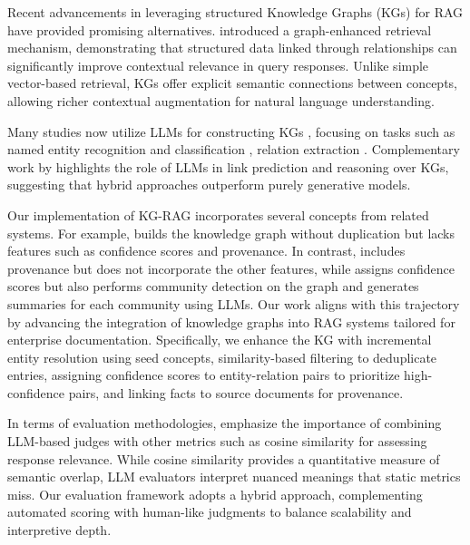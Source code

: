 Recent advancements in leveraging structured Knowledge Graphs (KGs) for RAG have provided promising alternatives. \citeauthor{edge2024local}\cite{edge2024local} introduced a graph-enhanced retrieval mechanism, demonstrating that structured data linked through relationships can significantly improve contextual relevance in query responses. Unlike simple vector-based retrieval, KGs offer explicit semantic connections between concepts, allowing richer contextual augmentation for natural language understanding.


Many studies now utilize LLMs for constructing KGs \cite{li2024contextualization}, focusing on tasks such as named entity recognition and classification \cite{li2021span,zhou2023universalner}, relation extraction \cite{jiang2024genres}. Complementary work by \citeauthor{shu2024knowledge}\cite{shu2024knowledge} highlights the role of LLMs in link prediction and reasoning over KGs, suggesting that hybrid approaches outperform purely generative models.

Our implementation of KG-RAG incorporates several concepts from related systems. For example, \cite{lairgi2024itext2kg} builds the knowledge graph without duplication but lacks features such as confidence scores and provenance. In contrast, \cite{amaral2022prove} includes provenance but does not incorporate the other features, while \cite{edge2024local} assigns confidence scores but also performs community detection on the graph and generates summaries for each community using LLMs. Our work aligns with this trajectory by advancing the integration of knowledge graphs into RAG systems tailored for enterprise documentation. Specifically, we enhance the KG with incremental entity resolution using seed concepts, similarity-based filtering to deduplicate entries, assigning confidence scores to entity-relation pairs to prioritize high-confidence pairs, and linking facts to source documents for provenance.

In terms of evaluation methodologies, \cite{zheng2023judging} emphasize the importance of combining LLM-based judges with other metrics such as cosine similarity for assessing response relevance. While cosine similarity provides a quantitative measure of semantic overlap, LLM evaluators interpret nuanced meanings that static metrics miss. Our evaluation framework adopts a hybrid approach, complementing automated scoring with human-like judgments to balance scalability and interpretive depth.

